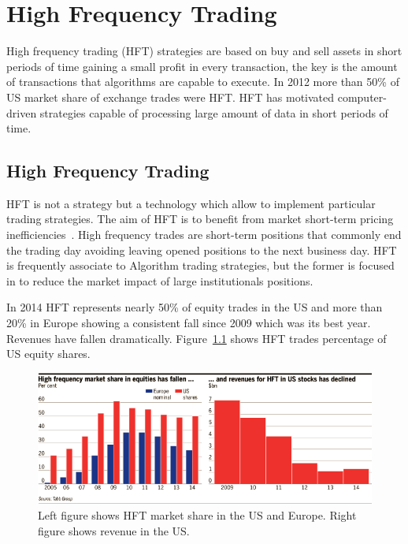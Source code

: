 \chapter{High Frequency Trading}

High frequency trading (HFT) strategies are based on buy and sell assets in
short periods of time gaining a small profit in every transaction, the key is
the amount of transactions that algorithms are capable to execute. 
In 2012 more than 50\% of US market share of exchange trades were HFT.  HFT has
motivated computer-driven strategies capable of processing large amount of data
in short periods of time. 


\section{High Frequency Trading}

HFT is not a strategy but a technology which allow to implement particular
trading strategies. The aim of HFT is to benefit from market short-term pricing
inefficiencies~\cite{chlistalla2011}.
High frequency trades are short-term positions that commonly end the trading
day avoiding leaving opened positions to the next business day. HFT is
frequently associate to Algorithm trading strategies, but the former is focused
in to reduce the market impact of large institutionals positions.

In 2014 HFT represents nearly 50\% of equity trades in the US and more than 20\%
in Europe showing a consistent fall since 2009 which was its best year. Revenues
have fallen dramatically.
Figure~\ref{fig:HFTmarket} shows HFT trades percentage of US equity shares.

\begin{figure}[!h]
  \centering
  \includegraphics[width=\textwidth]{img/HFTmarket}
  \caption{Left figure shows HFT market share in the US and Europe. Right figure
  shows revenue in the US.}
  \label{fig:HFTmarket}
\end{figure}

